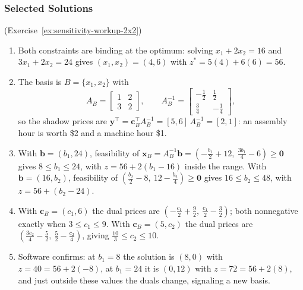 \subsubsection*{Selected Solutions}

\begin{solution}(Exercise~\ref{ex:sensitivity-workup-2x2})
\begin{enumerate}
\item Both constraints are binding at the optimum: solving $x_1 + 2x_2 = 16$ and $3x_1 + 2x_2 = 24$ gives $(x_1, x_2) = (4, 6)$ with $z^* = 5(4) + 6(6) = 56$.
\item The basis is $B = \{x_1, x_2\}$ with
\[
A_B = \begin{bmatrix} 1 & 2 \\ 3 & 2 \end{bmatrix}, \qquad
A_B^{-1} = \begin{bmatrix} -\tfrac12 & \tfrac12 \\[2pt] \tfrac34 & -\tfrac14 \end{bmatrix},
\]
so the shadow prices are $\mathbf{y}^\top = \mathbf{c}_B^\top A_B^{-1} = [5, 6]\,A_B^{-1} = [2, 1]$: an assembly hour is worth \$2 and a machine hour \$1.
\item With $\mathbf{b} = (b_1, 24)$, feasibility of $\mathbf{x}_B = A_B^{-1}\mathbf{b} = \left(-\tfrac{b_1}{2} + 12,\ \tfrac{3b_1}{4} - 6\right) \geq \mathbf{0}$ gives $8 \leq b_1 \leq 24$, with $z = 56 + 2(b_1 - 16)$ inside the range.  With $\mathbf{b} = (16, b_2)$, feasibility of $\left(\tfrac{b_2}{2} - 8,\ 12 - \tfrac{b_2}{4}\right) \geq \mathbf{0}$ gives $16 \leq b_2 \leq 48$, with $z = 56 + (b_2 - 24)$.
\item With $\mathbf{c}_B = (c_1, 6)$ the dual prices are $\left(-\tfrac{c_1}{2} + \tfrac92,\ \tfrac{c_1}{2} - \tfrac32\right)$; both nonnegative exactly when $3 \leq c_1 \leq 9$.  With $\mathbf{c}_B = (5, c_2)$ the dual prices are $\left(\tfrac{3c_2}{4} - \tfrac52,\ \tfrac52 - \tfrac{c_2}{4}\right)$, giving $\tfrac{10}{3} \leq c_2 \leq 10$.
\item Software confirms: at $b_1 = 8$ the solution is $(8,0)$ with $z = 40 = 56 + 2(-8)$, at $b_1 = 24$ it is $(0,12)$ with $z = 72 = 56 + 2(8)$, and just outside these values the duals change, signaling a new basis.
\end{enumerate}
\end{solution}

